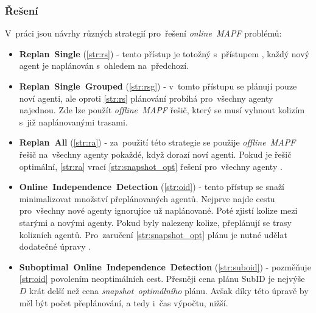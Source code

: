%

\subsubsection{Řešení~}\label{subsubsec:reseni_online_mapf}




V~práci \citet{Svancara} jsou návrhy různých strategií pro~řešení \emph{online~MAPF} problémů:
\begin{itemize}
	\item \textbf{Replan~Single} (\ref{str:rs}) - tento přístup je totožný s~přístupem ,
	každý nový agent je naplánován s~ohledem na~předchozí.
	\item \textbf{Replan~Single~Grouped}\label{par:replan_single_grouped} (\ref{str:rsg}) -
	v~tomto přístupu se plánují pouze noví agenti, ale oproti \ref{str:rs} plánování probíhá pro~všechny agenty najednou.
	Zde lze použít \emph{offline~MAPF} řešič, který se musí vyhnout kolizím s~již naplánovanými trasami.
	\item \textbf{Replan~All} (\ref{str:ra}) - za~použití této strategie se použije
	\emph{offline~MAPF} řešič na~všechny agenty pokaždé, když dorazí noví agenti.
	Pokud je řešič optimální, \ref{str:ra} vrací \ref{str:snapshot_opt} řešení pro~všechny agenty \citep{Svancara}.
	\item \textbf{Online~Independence~Detection} (\ref{str:oid}) - tento přístup se snaží minimalizovat množství přeplánovaných agentů.
	Nejprve najde cestu pro~všechny nové agenty ignorujíce už naplánované.
	Poté zjistí kolize mezi starými a novými agenty.
	Pokud byly nalezeny kolize, přeplánují se trasy kolizních agentů.
	Pro~zaručení \ref{str:snapshot_opt} plánu je nutné udělat dodatečné úpravy \citep{Svancara}.
	\item \textbf{Suboptimal~Online~Independence~Detection} (\ref{str:suboid}) - pozměňuje
	\ref{str:oid} povolením neoptimálních cest.
	Přesněji cena plánu SubID je nejvýše $D$ krát delší než cena \emph{snapshot~optimálního} plánu.
	Avšak díky této úpravě by měl být počet přeplánování, a tedy i~čas výpočtu, nižší.
\end{itemize}


